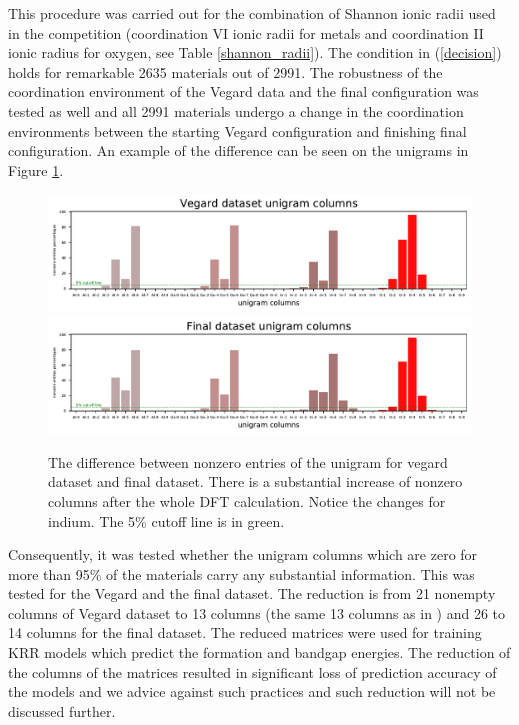 \documentclass[11pt,oneside,czech,american]{book} %
\theoremstyle{plain}
\theoremstyle{definition}
\begin{document}
This procedure was carried out for the combination of Shannon ionic radii used in the competition (coordination VI ionic radii for metals and coordination II ionic radius for oxygen, see Table \ref{shannon_radii}). The condition in (\ref{decision}) holds for remarkable 2635 materials out of 2991. The robustness of the coordination environment of the Vegard data and the final configuration was tested as well and all 2991 materials undergo a change in the coordination environments between the starting Vegard configuration and finishing final configuration. An example of the difference can be seen on the unigrams in Figure \ref{unigram_vegard_final}.
\begin{figure}[H]
	\centering
	\includegraphics[scale=0.8]{vegard_nonzero_unigram_competition.pdf}
	\includegraphics[scale=0.8]{final_nonzero_unigram_competition.pdf}
	\caption{The difference between nonzero entries of the unigram for vegard dataset and final dataset. There is a substantial increase of nonzero columns after the whole DFT calculation. Notice the changes for indium. The 5\% cutoff line is in green.}
	\label{unigram_vegard_final}
\end{figure}
Consequently, it was tested whether the unigram columns which are zero for more than 95\% of the materials carry any substantial information. This was tested for the Vegard and the final dataset. The reduction is from 21 nonempty columns of Vegard dataset to 13 columns (the same 13 columns as in \parencite{sutton19}) and 26 to 14 columns for the final dataset. The reduced matrices were used for training KRR models which predict the formation and bandgap energies. The reduction of the columns of the matrices resulted in significant loss of prediction accuracy of the models and we advice against such practices and such reduction will not be discussed further.
\end{document}
